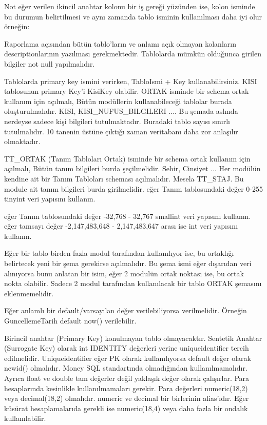 \documentclass[10pt,a4paper,draft]{article}
\begin{document}
Not eğer verilen ikincil anahtar kolonu bir iş gereği yüzünden ise,
kolon isminde bu durumun belirtilmesi ve aynı zamanda tablo isminin kullanılması daha iyi 
olur örneğin:






Raporlama açısından bütün tablo'ların ve anlamı açık olmayan kolanların 
  descriptionlarının yazılması gerekmektedir.		 
  			Tablolarda mümkün olduğunca girilen bilgiler not null yapılmalıdır.
  		 
  			Tablolarda primary key ismini verirken, TabloIsmi + Key 
  kullanabilirsiniz. KISI tablosunun primary Key'i KisiKey olabilir.		 
  			ORTAK isminde bir schema ortak kullanım için açılmalı, Bütün modüllerin 
  kullanabileceği tablolar burada oluşturulmalıdır.			KISI, KISI\_NUFUS\_BILGILERI 
  .... Bu şemada aslında nerdeyse sadece kişi bilgileri tutulmaktadır.
  Buradaki tablo sayısı sınırlı tutulmalıdır. 10 tanenin üstüne çıktığı zaman
  veritabanı daha zor anlaşılır olmaktadır.
  
  			TT\_ORTAK  (Tanım Tabloları Ortak) isminde bir schema ortak kullanım 
  için açılmalı, Bütün tanım bilgileri burda şeçilmelidir. 			Sehir, Cinsiyet 
  ...		 
  			Her modülün kendine ait bir Tanım Tabloları scheması açılmalıdır. 
  Mesela TT\_STAJ. Bu module ait tanım bilgileri burda girilmelidir. 		 
   eğer Tanım tablosundaki değer 0-255  tinyint veri yapısını kullanın.
  		 
   eğer Tanım tablosundaki değer  -32,768 - 32,767   smallint veri yapısını 
  kullanın.		 
   eğer tamsayı değer  -2,147,483,648 - 2,147,483,647 arası ise int veri 
  yapısını kullanın.		 
  
  
  			Eğer bir tablo birden fazla modul tarafından kullanılıyor ise, 
  bu ortaklığı belirtecek yeni bir şema gerekirse açılmalıdır. 
  Bu şema ismi eğer dışarıdan veri alınıyorsa bunu anlatan bir isim,
  eğer 2 modulün ortak noktası ise, bu ortak nokta olabilir.
  Sadece 2 modul tarafından kullanılacak bir tablo ORTAK şemasını eklenmemelidir.
  
  
  
  
  			Eğer anlamlı bir default/varsayılan değer verilebiliyorsa verilmelidir.
    Örneğin GuncellemeTarih default now() verilebilir.
  
  			Birincil anahtar (Primary Key) konulmayan tablo olmayacaktır.		 
  			Sentetik Anahtar (Surrogate Key) olarak int IDENTITY değerleri yerine 
  uniqueidentifier tercih edilmelidir.		 
  			Uniqueidentifier eğer PK olarak kullanılıyorsa default değer olarak 
  newid() olmalıdır.		 
  			 Money SQL standartında olmadığından kullanılmamalıdır. Ayrıca float ve 
  double tam değerler değil 			 yaklaşık değer olarak çalışırlar. Para 
  hesaplarında kesinlikle kullanılmamaları gerekir.		 
  			Para değerleri numeric(18,2) veya decimal(18,2) olmalıdır.	
  numeric ve decimal bir birlerinin alias'ıdır. 
    Eğer küsürat hesaplamalarıda gerekli ise numeric(18,4) veya daha fazla
    bir ondalık kullanılabilir.
\end{document}
